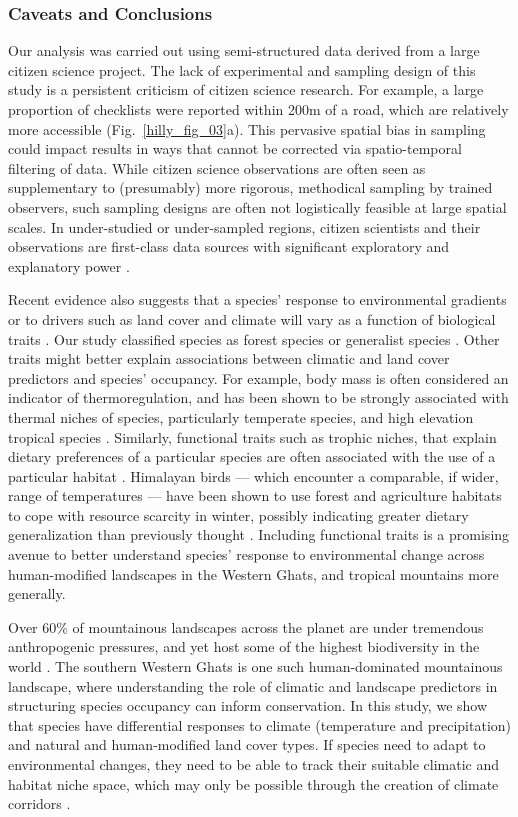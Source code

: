 \subsubsection*{Caveats and Conclusions}

Our analysis was carried out using semi-structured data derived from a large citizen science project.
The lack of experimental and sampling design of this study is a persistent criticism of citizen science research.
For example, a large proportion of checklists were reported within 200m of a road, which are relatively more accessible (Fig.~\ref{hilly_fig_03}a).
This pervasive spatial bias in sampling could impact results in ways that cannot be corrected via spatio-temporal filtering of data.
While citizen science observations are often seen as supplementary to (presumably) more rigorous, methodical sampling by trained observers, such sampling designs are often not logistically feasible at large spatial scales.
In under-studied or under-sampled regions, citizen scientists and their observations are first-class data sources with significant exploratory and explanatory power \citep{devictor2010,ellwood2017,robinson2020}.

Recent evidence also suggests that a species' response to environmental gradients or to drivers such as land cover and climate will vary as a function of biological traits \citep{mcgill2006}.
Our study classified species as forest species or generalist species \citep{ali1983}.
Other traits might better explain associations between climatic and land cover predictors and species' occupancy.
For example, body mass is often considered an indicator of thermoregulation, and has been shown to be strongly associated with thermal niches of species, particularly temperate species, and high elevation tropical species \citep{barve2021}.
Similarly, functional traits such as trophic niches, that explain dietary preferences of a particular species are often associated with the use of a particular habitat \citep{pigot2020}.
Himalayan birds --- which encounter a comparable, if wider, range of temperatures --- have been shown to use forest and agriculture habitats to cope with resource scarcity in winter, possibly indicating greater dietary generalization than previously thought \citep{elsen2018}.
Including functional traits is a promising avenue to better understand species' response to environmental change across human-modified landscapes in the Western Ghats, and tropical mountains more generally.

Over 60\% of mountainous landscapes across the planet are under tremendous anthropogenic pressures, and yet host some of the highest biodiversity in the world \citep{lasorte2010,elsen2020}.
The southern Western Ghats is one such human-dominated mountainous landscape, where understanding the role of climatic and landscape predictors in structuring species occupancy can inform conservation.
In this study, we show that species have differential responses to climate (temperature and precipitation) and natural and human-modified land cover types.
If species need to adapt to environmental changes, they need to be able to track their suitable climatic and habitat niche space, which may only be possible through the creation of climate corridors \citep{freeman2018}.

\newrefcontext[sorting=nyt]
\printbibliography[title=Literature~Cited,sorting=nyt,heading=subbibliography]
